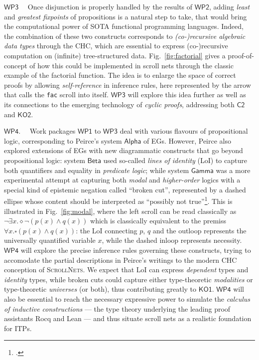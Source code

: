 \documentclass[12pt,draftproposal]{msca-pf}
\newcommand{\proj}{\small\textsc{ScrollNets}}
\newcommand{\CH}[1]{$\mathsf{C#1}$}
\newcommand{\KO}[1]{$\mathsf{KO#1}$}
\newcommand{\WP}[1]{$\mathsf{WP#1}$}
\begin{document}
    \WP{3}~~ Once disjunction is properly handled by the results of \WP{2}, adding \emph{least} and
    \emph{greatest fixpoints} of propositions is a natural step to take, that would bring the
    computational power of SOTA functional programming languages. Indeed, the combination of these
    two constructs corresponds to \emph{(co-)recursive algebraic data types} through the CHC, which
    are essential to express (co-)recursive computation on (infinite) tree-structured data.
    Fig.~\ref{fig:factorial} gives a proof-of-concept of how this could be implemented in scroll
    nets through the classic example of the factorial function. The idea is to enlarge the space of
    correct proofs by allowing \emph{self-reference} in inference rules, here represented by the
    arrow that calls the \texttt{fac} scroll into itself. \WP{3} will explore this idea further as
    well as its connections to the emerging technology of \emph{cyclic proofs}, addressing both
    \CH{2} and \KO{2}. 

    \WP{4}.~~ Work packages \WP{1} to \WP{3} deal with various flavours of propositional logic,
    corresponding to Peirce's system $\mathsf{Alpha}$ of EGs. However, Peirce also explored
    extensions of EGs with new diagrammatic constructs that go beyond propositional logic: system
    $\mathsf{Beta}$ used so-called \emph{lines of identity} (LoI) to capture both quantifiers and
    equality in \emph{predicate logic}; while system $\mathsf{Gamma}$ was a more experimental
    attempt at capturing both \emph{modal} and \emph{higher-order} logics with a special kind of
    epistemic negation called ``broken cut'', represented by a dashed ellipse whose content should
    be interpreted as ``possibly not true''\footcite{maGammaGraphCalculi2018}. This is illustrated
    in Fig.~\ref{fig:modal}, where the left scroll can be read classically as $\neg \exists x.
    \diamond \neg (p(x) \land q(x))$ which is classically equivalent to the premiss $\forall x.
    \square (p(x) \land q(x))$: the LoI connecting $p$, $q$ and the outloop represents the
    universally quantified variable $x$, while the dashed inloop represents necessity. \WP{4} will
    explore the precise inference rules governing these constructs, trying to accomodate the partial
    descriptions in Peirce's writings to the modern CHC conception of {\proj}. We expect that LoI
    can express \emph{dependent} types and \emph{identity} types, while broken cuts could capture
    either type-theoretic \emph{modalities} or type-theoretic \emph{universes} (or both), thus
    contributing greatly to \KO{1}. \WP{4} will also be essential to reach the necessary expressive
    power to simulate the \emph{calculus of inductive constructions} --- the type theory underlying
    the leading proof assistants Rocq and Lean --- and thus situate scroll nets as a realistic
    foundation for ITPs.
\end{document}

